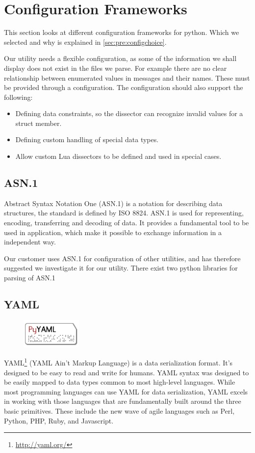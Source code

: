 \section{Configuration Frameworks}
\label{sec:pre:config}
This section looks at different configuration frameworks for python. Which we
selected and why is explained in \autoref{sec:pre:configchoice}.

Our utility needs a flexible configuration, as some of the information we
shall display does not exist in the files we parse. For example there are no
clear relationship between enumerated values in messages and their names.
These must be provided through a configuration. The configuration should also
support the following:
\begin{itemize}
	\item Defining data constraints, so the dissector can recognize invalid
		values for a struct member.
	\item Defining custom handling of special data types.
	\item Allow custom Lua dissectors to be defined and used in special cases.
\end{itemize}

\subsection{ASN.1}
Abstract Syntax Notation One (ASN.1) is a notation for describing data
structures, the standard is defined by ISO 8824. ASN.1 is used for
representing, encoding, transferring and decoding of data. It provides a
fundamental tool to be used in application, which make it possible to exchange
information in a independent way.

Our customer uses ASN.1 for configuration of other utilities, and has therefore
suggested we investigate it for our utility. There exist two python libraries
for parsing of ASN.1

\subsection{YAML}
\begin{figure}
	\vspace{-30pt}
	\includegraphics[width=3cm]{./planning/img/pyyaml_logo}
	\vspace{-30pt}
\end{figure}
YAML\footnote{\url{http://yaml.org/}} (YAML Ain't Markup Language) is a data
serialization format. It's designed to be easy to read and write for humans.
YAML syntax was designed to be easily mapped to data types common to most
high-level languages. While most programming languages can use YAML for data
serialization, YAML excels in working with those languages that are
fundamentally built around the three basic primitives. These include the new
wave of agile languages such as Perl, Python, PHP, Ruby, and Javascript.

